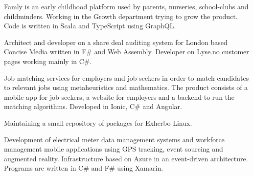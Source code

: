 \documentclass[10pt,a4paper]{altacv}
\begin{document}




\begin{fullwidth}
\makecvheader
\end{fullwidth}




Famly is an early childhood platform used by parents, nurseries, school-clubs and childminders. Working in the Growth department trying to grow the product. Code is written in Scala and TypeScript using GraphQL.

\divider

Architect and developer on a share deal auditing system for London based Concise Media written in F\# and Web Assembly.
Developer on Lyse.no customer pages working mainly in C\#.

\divider

Job matching services for employers and job seekers in order to match candidates to relevant jobs using metaheuristics and mathematics. The product consists of a mobile app for job seekers, a website for employers and a backend to run the matching algorithms. Developed in Ionic, C\# and Angular.

\divider

Maintaining a small repository of packages for Exherbo Linux.

\divider

Development of electrical meter data management systems and workforce management mobile applications using GPS tracking, event sourcing and augmented reality. Infrastructure based on Azure in an event-driven architecture. Programs are written in C\# and F\# using Xamarin.
\end{document}
